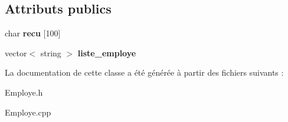 \subsection*{Attributs publics}
\begin{DoxyCompactItemize}
\item 
\hypertarget{class_employe_a7a87458ff5c63d80a89a1c788938bd0b}{char {\bfseries recu} \mbox{[}100\mbox{]}}\label{class_employe_a7a87458ff5c63d80a89a1c788938bd0b}

\item 
\hypertarget{class_employe_ad35ecaa896328b976804d3f283e0a4ac}{vector$<$ string $>$ {\bfseries liste\-\_\-employe}}\label{class_employe_ad35ecaa896328b976804d3f283e0a4ac}

\end{DoxyCompactItemize}


La documentation de cette classe a été générée à partir des fichiers suivants \-:\begin{DoxyCompactItemize}
\item 
Employe.\-h\item 
Employe.\-cpp\end{DoxyCompactItemize}
